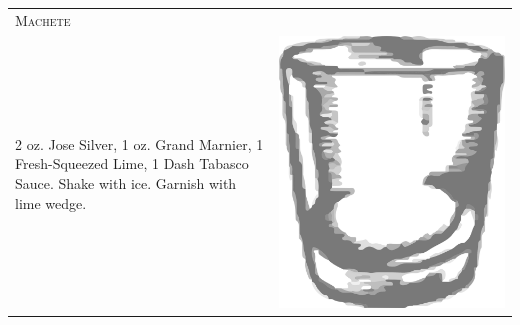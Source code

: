 \documentclass{article}
\begin{document}
\begin{tabular}{p{2in} p{0.5in}}
\multicolumn{2}{p{3in}}{\centering\Huge\textsc{Machete}} \\ 
  \vspace{-0.1in}2 oz. Jose Silver, 1 oz. Grand Marnier, 1 Fresh-Squeezed Lime, 1 Dash Tabasco Sauce. Shake with ice. Garnish with lime wedge. &
  \vspace{-0.1in} \includegraphics{rocks_glass.png}
\end{tabular}
\end{document}
